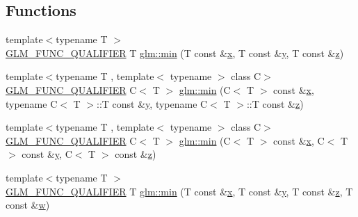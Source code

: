 \subsection*{Functions}
\begin{DoxyCompactItemize}
\item 
{\footnotesize template$<$typename T $>$ }\\\mbox{\hyperlink{setup_8hpp_a33fdea6f91c5f834105f7415e2a64407}{G\+L\+M\+\_\+\+F\+U\+N\+C\+\_\+\+Q\+U\+A\+L\+I\+F\+I\+ER}} T \mbox{\hyperlink{group__gtx__extented__min__max_ga713d3f9b3e76312c0d314e0c8611a6a6}{glm\+::min}} (T const \&\mbox{\hyperlink{glad_8h_a92d0386e5c19fb81ea88c9f99644ab1d}{x}}, T const \&\mbox{\hyperlink{glad_8h_a66ddd433d2cacfe27f5906b7e86faeed}{y}}, T const \&\mbox{\hyperlink{glad_8h_acb78bf1972d3eaf07da34ff2e0a2f133}{z}})
\item 
{\footnotesize template$<$typename T , template$<$ typename $>$ class C$>$ }\\\mbox{\hyperlink{setup_8hpp_a33fdea6f91c5f834105f7415e2a64407}{G\+L\+M\+\_\+\+F\+U\+N\+C\+\_\+\+Q\+U\+A\+L\+I\+F\+I\+ER}} C$<$ T $>$ \mbox{\hyperlink{group__gtx__extented__min__max_ga74d1a96e7cdbac40f6d35142d3bcbbd4}{glm\+::min}} (C$<$ T $>$ const \&\mbox{\hyperlink{glad_8h_a92d0386e5c19fb81ea88c9f99644ab1d}{x}}, typename C$<$ T $>$\+::T const \&\mbox{\hyperlink{glad_8h_a66ddd433d2cacfe27f5906b7e86faeed}{y}}, typename C$<$ T $>$\+::T const \&\mbox{\hyperlink{glad_8h_acb78bf1972d3eaf07da34ff2e0a2f133}{z}})
\item 
{\footnotesize template$<$typename T , template$<$ typename $>$ class C$>$ }\\\mbox{\hyperlink{setup_8hpp_a33fdea6f91c5f834105f7415e2a64407}{G\+L\+M\+\_\+\+F\+U\+N\+C\+\_\+\+Q\+U\+A\+L\+I\+F\+I\+ER}} C$<$ T $>$ \mbox{\hyperlink{group__gtx__extented__min__max_ga42b5c3fc027fd3d9a50d2ccc9126d9f0}{glm\+::min}} (C$<$ T $>$ const \&\mbox{\hyperlink{glad_8h_a92d0386e5c19fb81ea88c9f99644ab1d}{x}}, C$<$ T $>$ const \&\mbox{\hyperlink{glad_8h_a66ddd433d2cacfe27f5906b7e86faeed}{y}}, C$<$ T $>$ const \&\mbox{\hyperlink{glad_8h_acb78bf1972d3eaf07da34ff2e0a2f133}{z}})
\item 
{\footnotesize template$<$typename T $>$ }\\\mbox{\hyperlink{setup_8hpp_a33fdea6f91c5f834105f7415e2a64407}{G\+L\+M\+\_\+\+F\+U\+N\+C\+\_\+\+Q\+U\+A\+L\+I\+F\+I\+ER}} T \mbox{\hyperlink{group__gtx__extented__min__max_ga95466987024d03039607f09e69813d69}{glm\+::min}} (T const \&\mbox{\hyperlink{glad_8h_a92d0386e5c19fb81ea88c9f99644ab1d}{x}}, T const \&\mbox{\hyperlink{glad_8h_a66ddd433d2cacfe27f5906b7e86faeed}{y}}, T const \&\mbox{\hyperlink{glad_8h_acb78bf1972d3eaf07da34ff2e0a2f133}{z}}, T const \&\mbox{\hyperlink{glad_8h_a1d0296e9e835f2e1ee17634af95fc1ec}{w}})

\end{DoxyCompactItemize}
